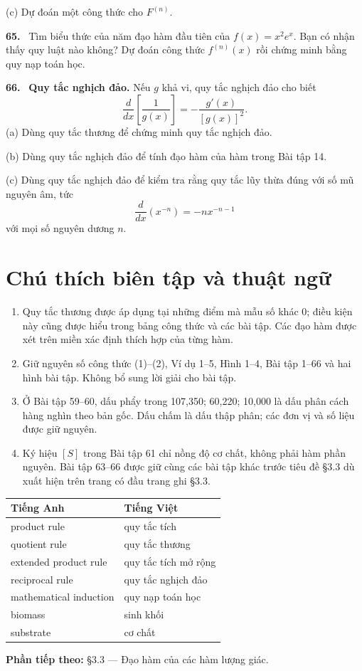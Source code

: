 \documentclass[12pt,a4paper]{article}
\newcommand{\bt}[1]{\par\smallskip\noindent\textbf{#1.}\ }
\begin{document}
(c) Dự đoán một công thức cho $F^{(n)}$.
\bt{65} Tìm biểu thức của năm đạo hàm đầu tiên của $f(x)=x^2e^x$. Bạn có nhận thấy quy luật nào không? Dự đoán công thức $f^{(n)}(x)$ rồi chứng minh bằng quy nạp toán học.
\bt{66} \textbf{Quy tắc nghịch đảo.} Nếu $g$ khả vi, quy tắc nghịch đảo cho biết
\[\frac{d}{dx}\left[\frac1{g(x)}\right]=-\frac{g'(x)}{[g(x)]^2}.\]
(a) Dùng quy tắc thương để chứng minh quy tắc nghịch đảo.

(b) Dùng quy tắc nghịch đảo để tính đạo hàm của hàm trong Bài tập 14.

(c) Dùng quy tắc nghịch đảo để kiểm tra rằng quy tắc lũy thừa đúng với số mũ nguyên âm, tức
\[\frac{d}{dx}(x^{-n})=-nx^{-n-1}\]
với mọi số nguyên dương $n$.
\section*{Chú thích biên tập và thuật ngữ}
\begin{enumerate}[leftmargin=*]
\item Quy tắc thương được áp dụng tại những điểm mà mẫu số khác 0; điều kiện này cũng được hiểu trong bảng công thức và các bài tập. Các đạo hàm được xét trên miền xác định thích hợp của từng hàm.
\item Giữ nguyên số công thức (1)–(2), Ví dụ 1–5, Hình 1–4, Bài tập 1–66 và hai hình bài tập. Không bổ sung lời giải cho bài tập.
\item Ở Bài tập 59–60, dấu phẩy trong 107,350; 60,220; 10,000 là dấu phân cách hàng nghìn theo bản gốc. Dấu chấm là dấu thập phân; các đơn vị và số liệu được giữ nguyên.
\item Ký hiệu $[S]$ trong Bài tập 61 chỉ nồng độ cơ chất, không phải hàm phần nguyên. Bài tập 63–66 được giữ cùng các bài tập khác trước tiêu đề §3.3 dù xuất hiện trên trang có đầu trang ghi §3.3.
\end{enumerate}
\begin{center}\begin{tabular}{ll}\toprule
Tiếng Anh&Tiếng Việt\\\midrule
product rule&quy tắc tích\\
quotient rule&quy tắc thương\\
extended product rule&quy tắc tích mở rộng\\
reciprocal rule&quy tắc nghịch đảo\\
mathematical induction&quy nạp toán học\\
biomass&sinh khối\\
substrate&cơ chất\\\bottomrule
\end{tabular}\end{center}
\noindent\textbf{Phần tiếp theo:} §3.3 — Đạo hàm của các hàm lượng giác.
\end{document}

